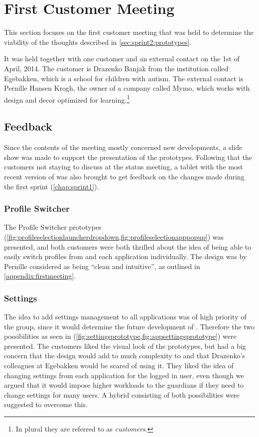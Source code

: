 \section{First Customer Meeting}\label{sec:sprint2:firstmeeting}
This section focuses on the first customer meeting that was held to determine the viability of the thoughts described in \cref{sec:sprint2:prototypes}.

It was held together with one customer and an external contact on the 1st of April, 2014.
The customer is Drazenko Banjak from the institution called Egebakken, which is a school for children with autism.
The external contact is Pernille Hansen Krogh, the owner of a company called Mymo, which works with design and decor optimized for learning.\footnote{In plural they are referred to as \textit{customers}.}


\subsection{Feedback}
Since the contents of the meeting mostly concerned new developments, a slide show was made to support the presentation of the prototypes.
Following that the customers not staying to discuss \giraf at the status meeting, a tablet with the most recent version of \launcher was also brought to get feedback on the changes made during the first sprint (\cref{chap:sprint1}).


\subsubsection*{Profile Switcher}
The Profile Switcher prototypes (\cref{fig:profileselectionlauncherdropdown,fig:profileselectionapppopup}) was presented, and both customers were both thrilled about the idea of being able to easily switch profiles from \launcher and each \giraf application individually.
The design was by Pernille considered as being ``clean and intuitive'', as outlined in \cref{appendix:firstmeeting}.


\subsubsection*{Settings}
The idea to add settings management to all \giraf applications was of high priority of the group, since it would determine the future development of \launcher.
Therefore the two possibilities as seen in (\cref{fig:settingsprototype,fig:appsettingsprototype}) were presented.
The customers liked the visual look of the prototypes, but had a big concern that the design would add to much complexity to \launcher and that Drazenko's colleagues at Egebakken would be scared of using it.
They liked the idea of changing settings from each application for the logged in user, even though we argued that it would impose higher workloads to the guardians if they need to change settings for many users.
A hybrid consisting of both possibilities were suggested to overcome this.

